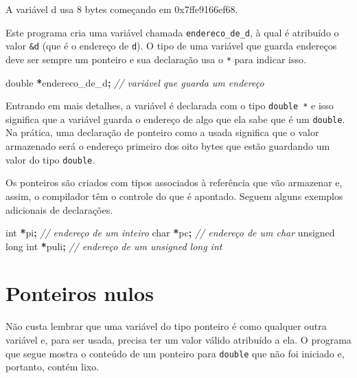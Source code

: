 \documentclass[
  11pt,
  a4paper,
]{scrbook}
\newenvironment{Shaded}{\begin{snugshade}}{\end{snugshade}}
\newcommand{\CommentTok}[1]{\textcolor[rgb]{0.56,0.35,0.01}{\textit{#1}}}
\newcommand{\DataTypeTok}[1]{\textcolor[rgb]{0.13,0.29,0.53}{#1}}
\newcommand{\NormalTok}[1]{#1}
\newcommand{\OperatorTok}[1]{\textcolor[rgb]{0.81,0.36,0.00}{\textbf{#1}}}
\begin{document}
\begin{Shaded}
\begin{Highlighting}[]
\NormalTok{A variável d usa 8 bytes começando em 0x7ffe9166ef68.}
\end{Highlighting}
\end{Shaded}

Este programa cria uma variável chamada \texttt{endereco\_de\_d}, à qual
é atribuído o valor \texttt{\&d} (que é o endereço de \texttt{d}). O
tipo de uma variável que guarda endereços deve ser sempre um ponteiro e
sua declaração usa o \texttt{*} para indicar isso.

\begin{Shaded}
\begin{Highlighting}[]
\DataTypeTok{double} \OperatorTok{*}\NormalTok{endereco\_de\_d}\OperatorTok{;}  \CommentTok{// variável que guarda um endereço}
\end{Highlighting}
\end{Shaded}

Entrando em mais detalhes, a variável é declarada com o tipo
\texttt{double\ *} e isso significa que a variável guarda o endereço de
algo que ela sabe que é um \texttt{double}. Na prática, uma declaração
de ponteiro como a usada significa que o valor armazenado será o
endereço primeiro dos oito bytes que estão guardando um valor do tipo
\texttt{double}.

Os ponteiros são criados com tipos associados à referência que vão
armazenar e, assim, o compilador têm o controle do que é apontado.
Seguem alguns exemplos adicionais de declarações.

\begin{Shaded}
\begin{Highlighting}[]
\DataTypeTok{int} \OperatorTok{*}\NormalTok{pi}\OperatorTok{;}  \CommentTok{// endereço de um inteiro}
\DataTypeTok{char} \OperatorTok{*}\NormalTok{pc}\OperatorTok{;}  \CommentTok{// endereço de um char}
\DataTypeTok{unsigned} \DataTypeTok{long} \DataTypeTok{int} \OperatorTok{*}\NormalTok{puli}\OperatorTok{;}  \CommentTok{// endereço de um unsigned long int}
\end{Highlighting}
\end{Shaded}

\section{Ponteiros nulos}\label{ponteiros-nulos}

Não custa lembrar que uma variável do tipo ponteiro é como qualquer
outra variável e, para ser usada, precisa ter um valor válido atribuído
a ela. O programa que segue mostra o conteúdo de um ponteiro para
\texttt{double} que não foi iniciado e, portanto, contém lixo.
\end{document}
